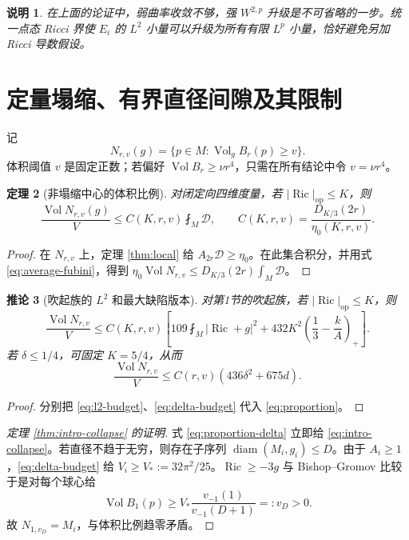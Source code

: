 \documentclass[UTF8,fontset=fandol,zihao=-4]{ctexart}
\theoremstyle{cn}
\newtheorem{theorem}{定理}[section]
\newtheorem{corollary}[theorem]{推论}
\newtheorem{remark}[theorem]{说明}
\DeclareMathOperator{\Ric}{Ric}
\DeclareMathOperator{\Vol}{Vol}
\DeclareMathOperator{\diam}{diam}
\newcommand{\op}{\mathrm{op}}
\newcommand{\av}{\fint}
\newcommand{\Dcal}{\mathcal D}
\numberwithin{equation}{section}
\begin{document}
\begin{remark}
在上面的论证中，弱曲率收敛不够，强 $W^{2,p}$ 升级是不可省略的一步。统一点态 Ricci 界使 $E_i$ 的 $L^2$ 小量可以升级为所有有限 $L^p$ 小量，恰好避免另加 Ricci 导数假设。
\end{remark}

\section{定量塌缩、有界直径间隙及其限制}

记
\[
N_{r,v}(g)=\{p\in M:\Vol_gB_r(p)\ge v\}.
\]
体积阈值 $v$ 是固定正数；若偏好 $\Vol B_r\ge\nu r^4$，只需在所有结论中令 $v=\nu r^4$。

\begin{theorem}[非塌缩中心的体积比例]\label{thm:proportion}
对闭定向四维度量，若 $|\Ric|_{\op}\le K$，则
\begin{equation}\label{eq:proportion}
\frac{\Vol N_{r,v}(g)}V
\le C(K,r,v)\av_M\Dcal,
\qquad C(K,r,v)=\frac{D_{K/3}(2r)}{\eta_0(K,r,v)}.
\end{equation}
\end{theorem}
\begin{proof}
在 $N_{r,v}$ 上，定理 \ref{thm:local} 给 $A_{2r}\Dcal\ge\eta_0$。在此集合积分，并用式 \eqref{eq:average-fubini}，得到
$\eta_0\Vol N_{r,v}\le D_{K/3}(2r)\int_M\Dcal$。
\end{proof}

\begin{corollary}[吹起族的 $L^2$ 和最大缺陷版本]\label{cor:quant-collapse}
对第1节的吹起族，若 $|\Ric|_{\op}\le K$，则
\begin{equation}\label{eq:proportion-L2}
\frac{\Vol N_{r,v}}V\le C(K,r,v)
\left[109\av_M|\Ric+g|^2+432K^2\left(\frac13-\frac{k}{A}\right)_+\right].
\end{equation}
若 $\delta\le1/4$，可固定 $K=5/4$，从而
\begin{equation}\label{eq:proportion-delta}
\boxed{\frac{\Vol N_{r,v}}V\le C(r,v)(436\delta^2+675d).}
\end{equation}
\end{corollary}
\begin{proof}
分别把 \eqref{eq:l2-budget}、\eqref{eq:delta-budget} 代入 \eqref{eq:proportion}。
\end{proof}

\begin{proof}[定理 \ref{thm:intro-collapse} 的证明]
式 \eqref{eq:proportion-delta} 立即给 \eqref{eq:intro-collapse}。若直径不趋于无穷，则存在子序列 $\diam(M_i,g_i)\le D$。由于 $A_i\ge1$，\eqref{eq:delta-budget} 给
$V_i\ge V_*:=32\pi^2/25$。$\Ric\ge-3g$ 与 Bishop--Gromov 比较于是对每个球心给
\[
\Vol B_1(p)\ge V_*\frac{v_{-1}(1)}{v_{-1}(D+1)}=:v_D>0.
\]
故 $N_{1,v_D}=M_i$，与体积比例趋零矛盾。
\end{proof}
\end{document}
